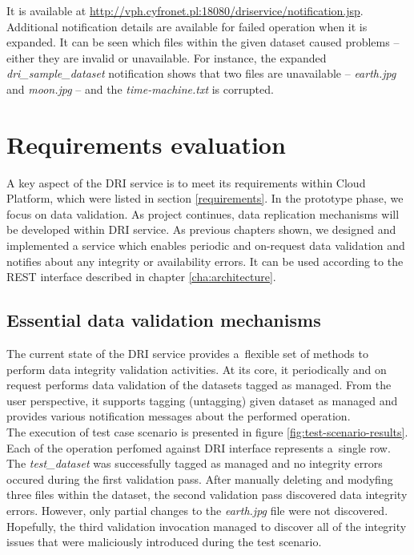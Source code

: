It is available at \url{http://vph.cyfronet.pl:18080/driservice/notification.jsp}.\\

Additional notification details are available for failed operation when it is
expanded. It can be seen which files within the given dataset caused problems --
either they are invalid or unavailable. For instance, the expanded 
\textit{dri\_sample\_dataset} notification shows that two files are unavailable
-- \textit{earth.jpg} and \textit{moon.jpg} -- and the \textit{time-machine.txt}
is corrupted.

\section{Requirements evaluation}
A key aspect of the DRI service is to meet its requirements within Cloud
Platform, which were listed in section \ref{requirements}. In the prototype
phase, we focus on data validation. As project continues, data
replication mechanisms will be developed within DRI service. As previous
chapters shown, we designed and implemented a service which enables periodic
and on-request data validation and notifies about any integrity or availability
errors. It can be used according to the REST interface described in chapter
\ref{cha:architecture}.

\subsection{Essential data validation mechanisms}
The current state of the DRI service provides a~flexible set of methods to perform
data integrity validation activities. At its core, it periodically and on request
performs data validation of the datasets tagged as managed. From the user perspective, it
supports tagging (untagging) given dataset as managed and provides various notification
messages about the performed operation.\\

The execution of test case scenario is presented in figure \ref{fig:test-scenario-results}.
Each of the operation perfomed against DRI interface represents a~single row. The
\textit{test\_dataset} was successfully tagged as managed and no integrity errors occured during the
first validation pass. After manually deleting and modyfing three files within the dataset, the second
validation pass discovered data integrity errors. However, only partial changes to the
\textit{earth.jpg} file were not discovered. Hopefully, the third validation invocation
managed to discover all of the integrity issues that were maliciously introduced during
the test scenario. 

